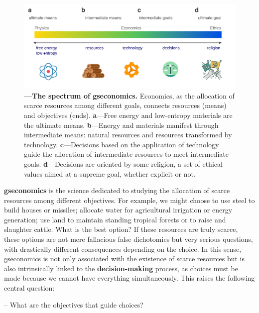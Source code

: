 \documentclass[./main_en.tex]{subfiles}
\begin{document}
\begin{figure}[t!] 
\centering				
\includegraphics[width=0.98\linewidth]{figs/fig_economics_en.jpg}		
\caption[The Spectrum of Economics]
{\textbf{---\;The spectrum of \gls{gseconomics}.}
    Economics, as the allocation of scarce resources among different goals, connects resources (means) and objectives (ends). \;\textbf{a}\;---\;Free energy and low-entropy materials are the ultimate means.
    \;\textbf{b}\;---\;Energy and materials manifest through intermediate means: natural resources and resources transformed by technology.
    \;\textbf{c}\;---\;Decisions based on the application of technology guide the allocation of intermediate resources to meet intermediate goals.
    \;\textbf{d}\;---\;Decisions are oriented by some religion, a set of ethical values aimed at a supreme goal, whether explicit or not.}
\label{fig:eco:economics} 		
\end{figure}

\par \textbf{\gls{gseconomics}} is the science dedicated to studying the allocation of scarce resources among different objectives. For example, we might choose to use steel to build houses or missiles; allocate water for agricultural irrigation or energy generation; use land to maintain standing tropical forests or to raise and slaughter cattle. What is the best option? If these resources are truly scarce, these options are not mere fallacious false dichotomies but very serious questions, with drastically different consequences depending on the choice. In this sense, \gls{gseconomics} is not only associated with the existence of scarce resources but is also intrinsically linked to the \textbf{decision-making} process, as choices must be made because we cannot have everything simultaneously. This raises the following central question:

-- What are the objectives that guide choices?
\end{document}

